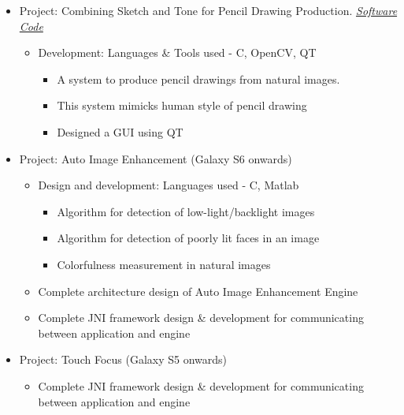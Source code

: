 \documentclass[letterpaper,11pt]{article}
\makeatletter
\def\CC{{C\nolinebreak[4]\hspace{-.05em}\raisebox{.4ex}{\tiny\bf ++}}}
\newcommand{\resitem}[1]{\item #1 \vspace{-2pt}}
\newcommand{\ressubheading}[4]{
	\begin{tabular*}{7.0in}{l@{\extracolsep{\fill}}r}
		\textbf{#1} & #2 \\
		\textit{#3} & \textit{#4} \\
	\end{tabular*}\vspace{-6pt}}
\makeatother
\begin{document}
\begin{itemize}
\begin{itemize}
				\vspace{1mm}
				\resitem[]{\faCircleO \hspace{1mm}Project: Combining Sketch and Tone for Pencil Drawing Production. 
					\faWindows \hspace{1mm} \href{https://github.com/nrupatunga/Pencil-Sketch/releases/tag/v1.0-beta}{\emph{Software}}
					\faGithub \hspace{1mm} \href{https://github.com/nrupatunga/Color-Pencil-Sketch}{\emph{Code}}}
				\begin{itemize}
						\resitem{Development: Languages \& Tools used - \CC, OpenCV, QT}
						\begin{itemize}
								\resitem{A system to produce pencil drawings from natural images.}
								\resitem{This system mimicks human style of pencil drawing}
								\resitem{Designed a GUI using QT}
						\end{itemize}
				\end{itemize}
				\vspace{1mm}
				\resitem[]{\faCircleO \hspace{1mm}Project: Auto Image Enhancement (Galaxy S6 onwards)}
				\begin{itemize}
						\resitem{Design and development: Languages used - C, Matlab}
						\begin{itemize}
								\resitem{Algorithm for detection of low-light/backlight images}
								\resitem{Algorithm for detection of poorly lit faces in an image}
								\resitem{Colorfulness measurement in natural images}
						\end{itemize}
						\resitem{Complete architecture design of Auto Image Enhancement Engine }
						\resitem{Complete JNI framework design \& development for communicating between application and engine}
				\end{itemize}
				\vspace{1mm}
				\resitem[]{\faCircleO \hspace{1mm}Project: Touch Focus (Galaxy S5 onwards)}
				\begin{itemize}
						\resitem{Complete JNI framework design \& development for communicating between application and engine}
				\end{itemize}
		\end{itemize}

\end{itemize}
\end{document}
